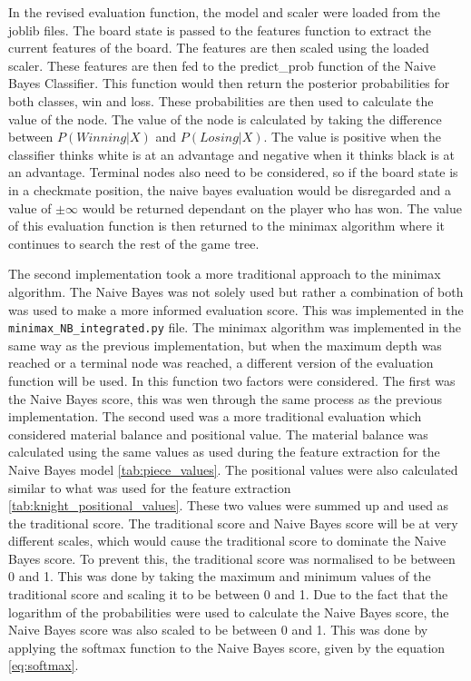 In the revised evaluation function, the model and scaler were loaded from the joblib files. The board state is passed to the features function to extract the current features of the board. The features are then scaled using the loaded scaler. These features are then fed to the predict\_prob function of the Naive Bayes Classifier. This function would then return the posterior probabilities for both classes, win and loss. These probabilities are then used to calculate the value of the node. The value of the node is calculated by taking the difference between $P(Winning | X)$ and $P(Losing | X)$. The value is positive when the classifier thinks white is at an advantage and negative when it thinks black is at an advantage. Terminal nodes also need to be considered, so if the board state is in a checkmate position, the naive bayes evaluation would be disregarded and a value of $\pm \infty$ would be returned dependant on the player who has won. The value of this evaluation function is then returned to the minimax algorithm where it continues to search the rest of the game tree. 

The second implementation took a more traditional approach to the minimax algorithm. The Naive Bayes was not solely used but rather a combination of both was used to make a more informed evaluation score. This was implemented in the \texttt{minimax\_NB\_integrated.py} file. The minimax algorithm was implemented in the same way as the previous implementation, but when the maximum depth was reached or a terminal node was reached, a different version of the evaluation function will be used. In this function two factors were considered. The first was the Naive Bayes score, this was wen through the same process as the previous implementation. The second used was a more traditional evaluation which considered material balance and positional value. The material balance was calculated using the same values as used during the feature extraction for the Naive Bayes model \ref{tab:piece_values}. The positional values were also calculated similar to what was used for the feature extraction \ref{tab:knight_positional_values}. These two values were summed up and used as the traditional score. The traditional score and Naive Bayes score will be at very different scales, which would cause the traditional score to dominate the Naive Bayes score. To prevent this, the traditional score was normalised to be between 0 and 1. This was done by taking the maximum and minimum values of the traditional score and scaling it to be between 0 and 1. Due to the fact that the logarithm of the probabilities were used to calculate the Naive Bayes score, the Naive Bayes score was also scaled to be between 0 and 1. This was done by applying the softmax function to the Naive Bayes score, given by the equation \ref{eq:softmax}. 


